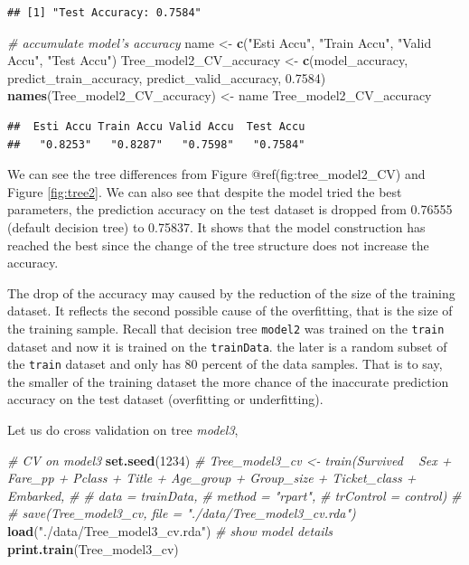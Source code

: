 \documentclass[
]{book}
\newenvironment{Shaded}{\begin{snugshade}}{\end{snugshade}}
\newcommand{\CommentTok}[1]{\textcolor[rgb]{0.56,0.35,0.01}{\textit{#1}}}
\newcommand{\DecValTok}[1]{\textcolor[rgb]{0.00,0.00,0.81}{#1}}
\newcommand{\FloatTok}[1]{\textcolor[rgb]{0.00,0.00,0.81}{#1}}
\newcommand{\KeywordTok}[1]{\textcolor[rgb]{0.13,0.29,0.53}{\textbf{#1}}}
\newcommand{\NormalTok}[1]{#1}
\newcommand{\StringTok}[1]{\textcolor[rgb]{0.31,0.60,0.02}{#1}}
\begin{document}
\begin{verbatim}
## [1] "Test Accuracy: 0.7584"
\end{verbatim}

\begin{Shaded}
\begin{Highlighting}[]
\CommentTok{# accumulate model's accuracy}
\NormalTok{name <-}\StringTok{ }\KeywordTok{c}\NormalTok{(}\StringTok{"Esti Accu"}\NormalTok{, }\StringTok{"Train Accu"}\NormalTok{, }\StringTok{"Valid Accu"}\NormalTok{, }\StringTok{"Test Accu"}\NormalTok{)}
\NormalTok{Tree_model2_CV_accuracy <-}\StringTok{ }\KeywordTok{c}\NormalTok{(model_accuracy, predict_train_accuracy, predict_valid_accuracy, }\FloatTok{0.7584}\NormalTok{)}
\KeywordTok{names}\NormalTok{(Tree_model2_CV_accuracy) <-}\StringTok{ }\NormalTok{name}
\NormalTok{Tree_model2_CV_accuracy}
\end{Highlighting}
\end{Shaded}

\begin{verbatim}
##  Esti Accu Train Accu Valid Accu  Test Accu 
##   "0.8253"   "0.8287"   "0.7598"   "0.7584"
\end{verbatim}

We can see the tree differences from Figure @ref(fig:tree\_model2\_CV) and Figure \ref{fig:tree2}. We can also see that despite the model tried the best parameters, the prediction accuracy on the test dataset is dropped from 0.76555 (default decision tree) to 0.75837. It shows that the model construction has reached the best since the change of the tree structure does not increase the accuracy.

The drop of the accuracy may caused by the reduction of the size of the training dataset. It reflects the second possible cause of the overfitting, that is the size of the training sample. Recall that decision tree \texttt{model2} was trained on the \texttt{train} dataset and now it is trained on the \texttt{trainData}. the later is a random subset of the \texttt{train} dataset and only has 80 percent of the data samples. That is to say, the smaller of the training dataset the more chance of the inaccurate prediction accuracy on the test dataset (overfitting or underfitting).

Let us do cross validation on tree \emph{model3},

\begin{Shaded}
\begin{Highlighting}[]
\CommentTok{# CV on model3}
\KeywordTok{set.seed}\NormalTok{(}\DecValTok{1234}\NormalTok{)}
\CommentTok{# Tree_model3_cv <- train(Survived ~ Sex + Fare_pp + Pclass + Title + Age_group + Group_size + Ticket_class  + Embarked,}
\CommentTok{# }
\CommentTok{#                        data = trainData,}
\CommentTok{#                        method = "rpart",}
\CommentTok{#                        trControl = control)}
\CommentTok{# }
\CommentTok{# save(Tree_model3_cv, file = "./data/Tree_model3_cv.rda")}
\KeywordTok{load}\NormalTok{(}\StringTok{"./data/Tree_model3_cv.rda"}\NormalTok{)}
\CommentTok{# show model details}
\KeywordTok{print.train}\NormalTok{(Tree_model3_cv)}
\end{Highlighting}
\end{Shaded}
\end{document}
